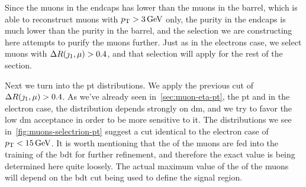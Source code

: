 Since the muons in the endcaps has lower \pt than the muons in the barrel, which is able to reconstruct muons with $p_{\mathrm{T}}>3\,\text{Ge\hspace{-.08em}V}$ only, the purity in the endcaps is much lower than the purity in the barrel, and the selection we are constructing here attempts to purify the muons further. Just as in the electrons case, we select muons with $\Delta R(\jmath_1,\mu)>0.4$, and that selection will apply for the rest of the section.

Next we turn into the \gls{pt} distributions. We apply the previous cut of $\Delta R(\jmath_1,\mu)>0.4$. As we've already seen in~\ref{sec:muon-eta-pt}, the \gls{pt} and in the electron case, the \pt distribution depends strongly on \gls{dm}, and we try to favor the low \gls{dm} acceptance in order to be more sensitive to it. The \pt distributions we see in~\ref{fig:muons-selectrion-pt} suggest a cut identical to the electron case of $p_{\mathrm{T}}<15\,\text{Ge\hspace{-.08em}V}$. It is worth mentioning that the \pt of the muons are fed into the training of the \gls{bdt} for further refinement, and therefore the exact value is being determined here quite loosely. The actual maximum value of the \pt of the muons will depend on the \gls{bdt} cut being used to define the signal region.

